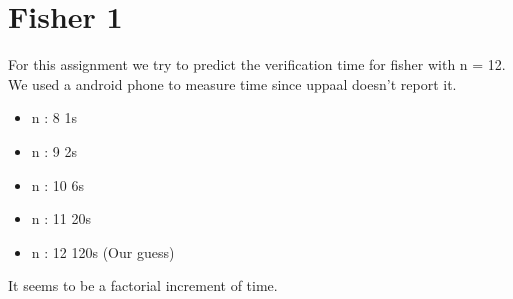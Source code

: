 \section{Fisher 1}
\label{sec:orga07fe9b}
For this assignment we try to predict the verification time for fisher with n = 12. We used a android phone to measure time since uppaal doesn't report it.

\begin{itemize}
\item n : 8     1s
\item n : 9     2s
\item n : 10    6s
\item n : 11    20s
\item n : 12    120s (Our guess)
\end{itemize}

It seems to be a factorial increment of time.

